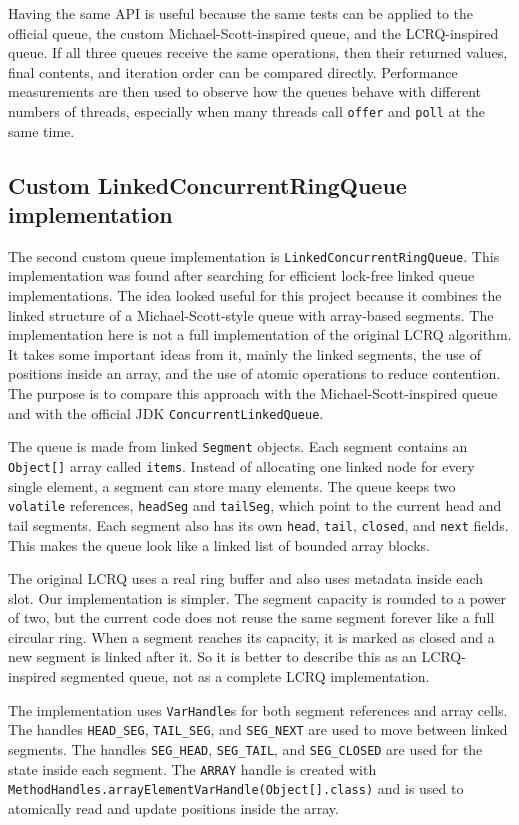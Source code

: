 Having the same API is useful because the same tests can be applied to the official queue, the custom Michael-Scott-inspired queue, and the LCRQ-inspired queue. If all three queues receive the same operations, then their returned values, final contents, and iteration order can be compared directly. Performance measurements are then used to observe how the queues behave with different numbers of threads, especially when many threads call \texttt{offer} and \texttt{poll} at the same time.


\subsection{Custom LinkedConcurrentRingQueue implementation}
The second custom queue implementation is \texttt{LinkedConcurrentRingQueue}. This implementation was found after searching for efficient lock-free linked queue implementations. The idea looked useful for this project because it combines the linked structure of a Michael-Scott-style queue with array-based segments. The implementation here is not a full implementation of the original LCRQ algorithm. It takes some important ideas from it, mainly the linked segments, the use of positions inside an array, and the use of atomic operations to reduce contention. The purpose is to compare this approach with the Michael-Scott-inspired queue and with the official JDK \texttt{ConcurrentLinkedQueue}. \cite{lcrq}

The queue is made from linked \texttt{Segment} objects. Each segment contains an \texttt{Object[]} array called \texttt{items}. Instead of allocating one linked node for every single element, a segment can store many elements. The queue keeps two \texttt{volatile} references, \texttt{headSeg} and \texttt{tailSeg}, which point to the current head and tail segments. Each segment also has its own \texttt{head}, \texttt{tail}, \texttt{closed}, and \texttt{next} fields. This makes the queue look like a linked list of bounded array blocks.

The original LCRQ uses a real ring buffer and also uses metadata inside each slot. Our implementation is simpler. The segment capacity is rounded to a power of two, but the current code does not reuse the same segment forever like a full circular ring. When a segment reaches its capacity, it is marked as closed and a new segment is linked after it. So it is better to describe this as an LCRQ-inspired segmented queue, not as a complete LCRQ implementation.

The implementation uses \texttt{VarHandle}s for both segment references and array cells. The handles \texttt{HEAD\_SEG}, \texttt{TAIL\_SEG}, and \texttt{SEG\_NEXT} are used to move between linked segments. The handles \texttt{SEG\_HEAD}, \texttt{SEG\_TAIL}, and \texttt{SEG\_CLOSED} are used for the state inside each segment. The \texttt{ARRAY} handle is created with \texttt{MethodHandles.arrayElementVarHandle(Object[].class)} and is used to atomically read and update positions inside the array.

